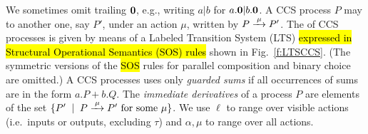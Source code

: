 We sometimes omit  trailing ${\boldsymbol 0}$, e.g., writing $a|b$ for $a.{\boldsymbol 0} |b .{\boldsymbol 0}$.
A CCS process $P$ may  to another one, say $P'$, under
  an action $\mu$, written by $P \arr{\mu} P'$.
The  of CCS processes is given by means of
a Labeled Transition System (LTS) \hl{expressed in Structural Operational
Semantics (SOS) rules} shown in Fig.~\ref{f:LTSCCS}.
(The symmetric versions of the \hl{SOS} rules for
parallel composition and binary choice are omitted.)
A CCS processes uses only \emph{guarded sums} if all occurrences of
sums are in the form $a.P + b.Q$. 
 The \emph{immediate derivatives} of a
process $P$ are elements of the set $\{P' \st P \arr\mu P' \mbox{
  for some $\mu$}\}$.
We use $\ell$ to range over
visible actions (i.e.~inputs or outputs, excluding  $\tau$)
and $\alpha, \mu$  to range over all actions.
